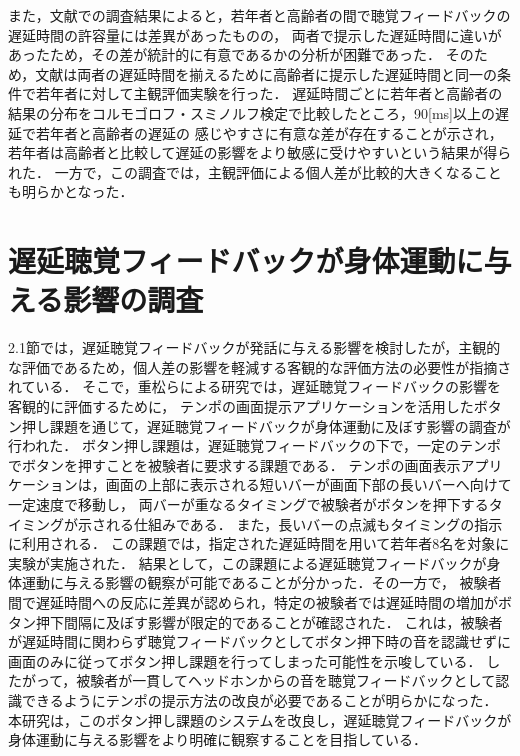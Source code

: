 また，文献\cite{shigematu-toukyoushibu}での調査結果によると，若年者と高齢者の間で聴覚フィードバックの遅延時間の許容量には差異があったものの，
両者で提示した遅延時間に違いがあったため，その差が統計的に有意であるかの分析が困難であった．
そのため，文献\cite{kayama}は両者の遅延時間を揃えるために高齢者に提示した遅延時間と同一の条件で若年者に対して主観評価実験を行った．
遅延時間ごとに若年者と高齢者の結果の分布をコルモゴロフ・スミノルフ検定で比較したところ，90[ms]以上の遅延で若年者と高齢者の遅延の
感じやすさに有意な差が存在することが示され，若年者は高齢者と比較して遅延の影響をより敏感に受けやすいという結果が得られた．
一方で，この調査では，主観評価による個人差が比較的大きくなることも明らかとなった．
\section{遅延聴覚フィードバックが身体運動に与える影響の調査}
2.1節では，遅延聴覚フィードバックが発話に与える影響を検討したが，主観的な評価であるため，個人差の影響を軽減する客観的な評価方法の必要性が指摘されている．
そこで，重松らによる研究\cite{shigematu}では，遅延聴覚フィードバックの影響を客観的に評価するために，
テンポの画面提示アプリケーション\cite{Syuuronn-shigematu}を活用したボタン押し課題を通じて，遅延聴覚フィードバックが身体運動に及ぼす影響の調査が行われた．
ボタン押し課題は，遅延聴覚フィードバックの下で，一定のテンポでボタンを押すことを被験者に要求する課題である．
テンポの画面表示アプリケーションは，画面の上部に表示される短いバーが画面下部の長いバーへ向けて一定速度で移動し，
両バーが重なるタイミングで被験者がボタンを押下するタイミングが示される仕組みである．
また，長いバーの点滅もタイミングの指示に利用される．
この課題では，指定された遅延時間を用いて若年者8名を対象に実験が実施された．
結果として，この課題による遅延聴覚フィードバックが身体運動に与える影響の観察が可能であることが分かった．その一方で，
被験者間で遅延時間への反応に差異が認められ，特定の被験者では遅延時間の増加がボタン押下間隔に及ぼす影響が限定的であることが確認された．
これは，被験者が遅延時間に関わらず聴覚フィードバックとしてボタン押下時の音を認識せずに画面のみに従ってボタン押し課題を行ってしまった可能性を示唆している．
したがって，被験者が一貫してヘッドホンからの音を聴覚フィードバックとして認識できるようにテンポの提示方法の改良が必要であることが明らかになった．
本研究は，このボタン押し課題のシステムを改良し，遅延聴覚フィードバックが身体運動に与える影響をより明確に観察することを目指している．
